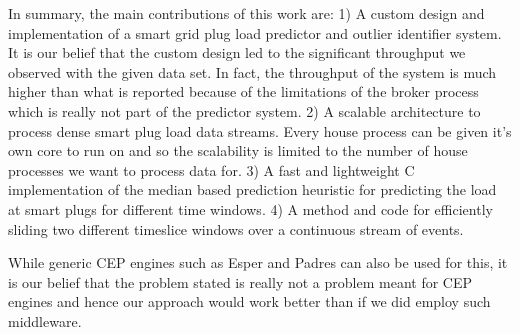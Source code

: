 
In summary, the main contributions of this work are:
1) A custom design and implementation of a smart grid plug load predictor and outlier identifier system.
It is our belief that the custom design led to the significant throughput we observed with the given data set.
In fact, the throughput of the system is much higher than what is reported because of the limitations of the broker process which is really not part of the predictor system.
2) A scalable architecture to process dense smart plug load data streams.
Every house process can be given it's own core to run on and so the scalability is limited to the number of house processes we want to process data for.
3) A fast and lightweight C implementation of the median based prediction heuristic for predicting the load at smart plugs for different time windows.
4) A method and code for efficiently sliding two different timeslice windows over a continuous stream of events.

While generic CEP engines such as Esper and Padres can also be used for this, it is our belief that the problem stated is really not a problem meant for CEP engines and hence our approach would work better than if we did employ such middleware.

